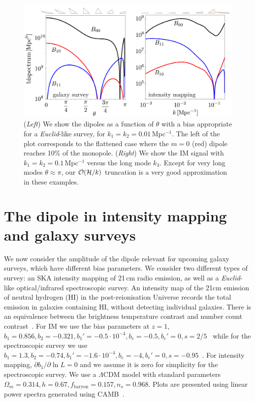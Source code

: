 \begin{figure}[!ht]
\begin{center}
\includegraphics[width=\columnwidth]{fig/figuresv2-01}
\caption{ (\emph{Left}) We show the dipoles as a function of $\theta$ with a bias appropriate for a \emph{Euclid}-like survey, for $k_1=k_2=0.01$\,Mpc$^{-1}$. The left of the plot corresponds to the flattened case where the $m=0$ (red) dipole reaches 10\% of the monopole.  (\emph{Right}) We show the IM signal with $k_1=k_2=0.1$\,Mpc$^{-1}$ versus the long mode $k_3$. Except for very long modes $\theta\approx\pi$, our $\mathcal{O}(\mathcal{H}/k)$ truncation is a very good approximation in these examples. }
\label{sankcjnakjdcs}
\end{center}
\end{figure}
 
\section{The dipole in intensity mapping and galaxy surveys}

We now consider the amplitude of the dipole relevant for upcoming galaxy surveys, which have different bias parameters. We consider two different types of survey: an SKA intensity mapping of 21\,cm radio emission, as well as a \emph{Euclid}-like optical/infrared spectroscopic survey.
An intensity map of the 21cm emission of neutral hydrogen (HI) in the post-reionisation Universe records the total emission in galaxies containing HI, without detecting individual galaxies. There is an equivalence between the brightness temperature contrast and number count contrast~\cite{Umeh:2015gza}. For IM we use the bias parameters at $z=1$, 
$b_1 = 0.856, b_2 = -0.321, b_1' = -0.5\cdot10^{-4}, b_e = -0.5, b_e'=0, s = 2/5$~\cite{Fonseca:2018hsu,Umeh:2015gza}
while for the spectroscopic survey we use 
$ b_1 = 1.3,b_2 = -0.74, b_1' = -1.6\cdot10^{-4},  b_e = -4, b_e' = 0, s = -0.95$~\cite{Camera:2018jys,Yankelevich:2018uaz}.
For intensity mapping, $ \partial b_1/\partial \ln L =0$ and we assume it is zero for simplicity for the spectroscopic survey. We use a $\Lambda$CDM model with standard parameters $\Omega_m=0.314, h=0.67, f_\text{baryon}=0.157, n_s=0.968$. Plots are presented using linear power spectra generated using CAMB~\cite{Lewis:1999bs}.

